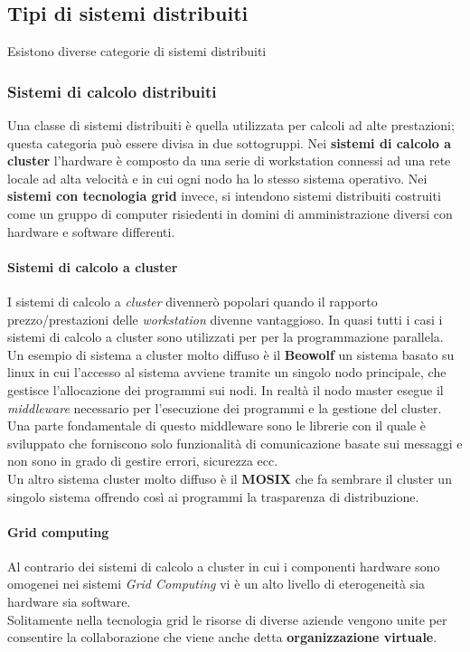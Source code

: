 \subsection{Tipi di sistemi distribuiti}
Esistono diverse categorie di sistemi distribuiti 
\subsubsection{Sistemi di calcolo distribuiti}
Una classe di sistemi distribuiti è quella utilizzata per calcoli ad alte prestazioni; questa categoria può essere divisa in due sottogruppi. Nei \textbf{sistemi di calcolo a cluster} l'hardware è composto da una serie di workstation connessi ad una rete locale ad alta velocità e in cui ogni nodo ha lo stesso sistema operativo. Nei \textbf{sistemi con tecnologia grid} invece, si intendono sistemi distribuiti costruiti come un gruppo di computer risiedenti in domini di amministrazione diversi con hardware e software differenti.
\paragraph{Sistemi di calcolo a cluster} I sistemi di calcolo a \emph{cluster} divennerò popolari quando il rapporto prezzo/prestazioni delle \emph{workstation} divenne vantaggioso. In quasi tutti i casi i sistemi di calcolo a cluster sono utilizzati per per la programmazione parallela.\\
Un esempio di sistema a cluster molto diffuso è il \textbf{Beowolf} un sistema basato su linux in cui l'accesso al sistema avviene tramite un singolo nodo principale, che gestisce l'allocazione dei programmi sui nodi. In realtà il nodo master esegue il \emph{middleware} necessario per l'esecuzione dei programmi e la gestione del cluster. Una parte fondamentale di questo middleware sono le librerie con il quale è sviluppato che forniscono solo funzionalità di comunicazione basate sui messaggi e non sono in grado di gestire errori, sicurezza ecc.\\
Un altro sistema cluster molto diffuso è il \textbf{MOSIX} che fa sembrare il cluster un singolo sistema offrendo così ai programmi la trasparenza di distribuzione.
\paragraph{Grid computing} Al contrario dei sistemi di calcolo a cluster in cui  i componenti hardware sono omogenei nei sistemi \emph{Grid Computing} vi è un alto livello di eterogeneità sia hardware sia software.\\
Solitamente nella tecnologia grid le risorse di diverse aziende vengono unite per consentire la collaborazione che viene anche detta \textbf{organizzazione virtuale}.
